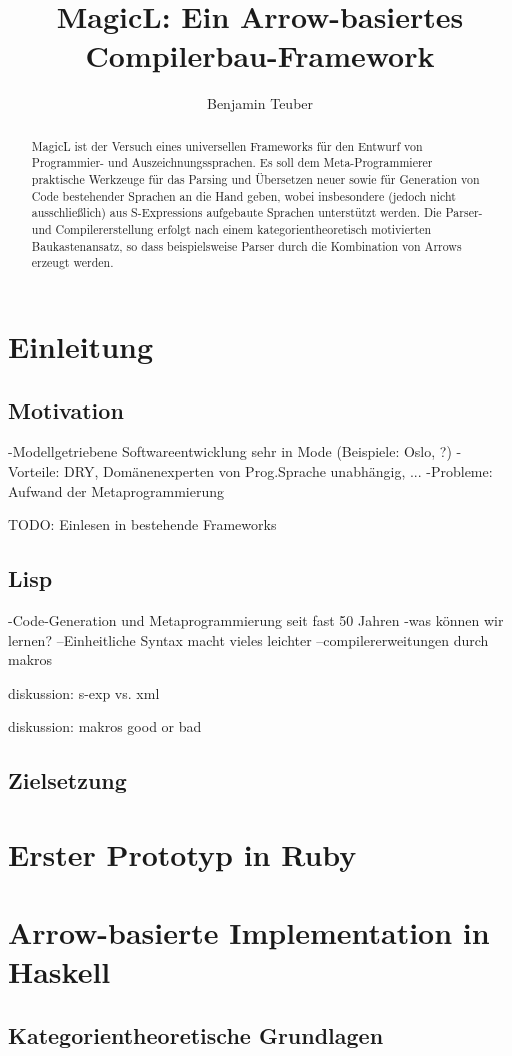 \documentclass[a4paper, bibgerm]{article}
\begin{document}
\title{MagicL: Ein Arrow-basiertes Compilerbau-Framework}
\author{Benjamin Teuber}


\begin{abstract}
  MagicL ist der Versuch eines universellen Frameworks für den Entwurf
  von Programmier- und Auszeichnungssprachen. Es soll dem
  Meta-Programmierer praktische Werkzeuge für das Parsing und Übersetzen
  neuer sowie für Generation von Code bestehender Sprachen an die Hand
  geben, wobei insbesondere (jedoch nicht ausschließlich) aus
  S-Expressions aufgebaute Sprachen unterstützt werden. Die Parser- und
  Compilererstellung erfolgt nach einem kategorientheoretisch
  motivierten Baukastenansatz, so dass beispielsweise Parser durch die
  Kombination von Arrows erzeugt werden.
\end{abstract}


\section{Einleitung}
\label{sec:intro}

\subsection{Motivation}
\label{sec:intro:motiv}

-Modellgetriebene Softwareentwicklung sehr in Mode (Beispiele: Oslo,
?)
-Vorteile: DRY, Domänenexperten von Prog.Sprache unabhängig, ...
-Probleme: Aufwand der Metaprogrammierung

TODO: Einlesen in bestehende Frameworks

\subsection{Lisp}
\label{sec:into:lisp}

-Code-Generation und Metaprogrammierung seit fast 50 Jahren
-was können wir lernen?
--Einheitliche Syntax macht vieles leichter
--compilererweitungen durch makros

diskussion: s-exp vs. xml

diskussion: makros good or bad

\subsection{Zielsetzung}
\label{sec:intro:goal}

\section{Erster Prototyp in Ruby}
\label{sec:sexy}

\section{Arrow-basierte Implementation in Haskell}
\label{sec:magicl}

\subsection{Kategorientheoretische Grundlagen}
\label{sec:magicl:cats}
\end{document}
